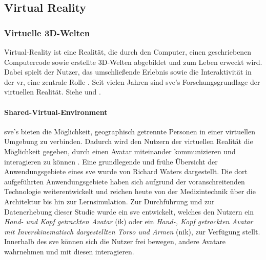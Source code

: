 \documentclass[a4paper,11pt]{article}%
\renewcommand{\\}{\vspace*{0.5\baselineskip} \newline}
\begin{document}
%
%
\newpage
	\subsection{Virtual Reality}
	\label{Virtual Reality}
		\subsubsection{Virtuelle 3D-Welten}
Virtual-Reality ist eine Realität, die durch den Computer, einen geschriebenen Computercode sowie erstellte 3D-Welten abgebildet und zum Leben erweckt wird. Dabei spielt der Nutzer, das umschließende Erlebnis sowie die Interaktivität in der \ac{vr}, eine zentrale Rolle \citep[p.6-12]{sherman2018understanding}.
	Seit vielen Jahren sind \ac{sve}'s Forschungsgrundlage der virtuellen Realität. Siehe \citep{shuffler2011there} \citep{steed1999leadership} und \citep{de2011level}.

\paragraph{Shared-Virtual-Environment}
	\ac{sve}'s bieten die Möglichkeit, geographisch getrennte Personen in einer virtuellen Umgebung zu verbinden. Dadurch wird den Nutzern der virtuellen Realität die Möglichkeit gegeben, durch einen Avatar miteinander kommunizieren und interagieren zu können \citep[p. 1-3]{pettifer1999designing}. Eine grundlegende und frühe Übersicht der Anwendungsgebiete eines \ac{sve} wurde von Richard Waters \citep{waters1997rise} dargestellt. Die dort aufgeführten Anwendungsgebiete haben sich aufgrund der voranschreitenden Technologie weiterentwickelt und reichen heute von der Medizintechnik über die Architektur bis hin zur Lernsimulation.
	Zur Durchführung und zur Datenerhebung dieser Studie wurde ein \ac{sve} entwickelt, welches den Nutzern ein \textit{Hand- und Kopf getrackten Avatar} (\ac{ik}) oder ein \textit{Hand-, Kopf getrackten Avatar mit Inverskinematisch dargestellten Torso und Armen} (\ac{nik}), zur Verfügung stellt. Innerhalb des \ac{sve} können sich die Nutzer frei bewegen, andere Avatare wahrnehmen und mit diesen interagieren.
\end{document}
